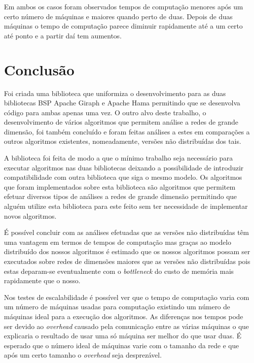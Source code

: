Em ambos os casos foram observados tempos de computação menores após um certo 
número de máquinas e maiores quando perto de duas. Depois de duas máquinas o 
tempo de computação parece diminuir rapidamente até a um certo até ponto e a 
partir daí tem aumentos.

\chapter{Conclusão}
Foi criada uma biblioteca que uniformiza o desenvolvimento para as duas 
bibliotecas BSP Apache Giraph e Apache Hama permitindo que se desenvolva código 
para ambas apenas uma vez. O outro alvo deste trabalho, o desenvolvimento de 
vários algoritmos que permitem análise a redes de grande dimensão, foi também 
concluído e foram feitas análises a estes em comparações a outros algoritmos 
existentes, nomeadamente, versões não distribuídas dos tais.

A biblioteca foi feita de modo a que o mínimo trabalho seja necessário para 
executar algoritmos nas duas bibliotecas deixando a possibilidade de introduzir 
compatibilidade com outra biblioteca que siga o mesmo modelo. Os algoritmos que 
foram implementados sobre esta biblioteca são algoritmos que permitem efetuar 
diversos tipos de análises a redes de grande dimensão permitindo que alguém 
utilize esta biblioteca para este feito sem ter necessidade de implementar novos 
algoritmos.

É possível concluir com as análises efetuadas que as versões não distribuídas 
têm uma vantagem em termos de tempos de computação mas graças ao modelo 
distribuído dos nossos algoritmos é estimado que os nossos algoritmos possam ser 
executados sobre redes de dimensões maiores que as versões não distribuídas pois 
estas deparam-se eventualmente com o \textit{bottleneck} do custo de memória 
mais rapidamente que o nosso.

Nos testes de escalabilidade é possível ver que o tempo de computação 
varia com um número de máquinas usadas para computação existindo um número de 
máquinas ideal para a execução dos algoritmos. As diferenças nos tempos pode ser 
devido ao \textit{overhead} causado pela comunicação entre as várias máquinas o 
que explicaria o resultado de usar uma só máquina ser melhor do que usar duas. É 
esperado que o número ideal de máquinas varie com o tamanho da rede e que após 
um certo tamanho o \textsl{overhead} seja desprezável.


